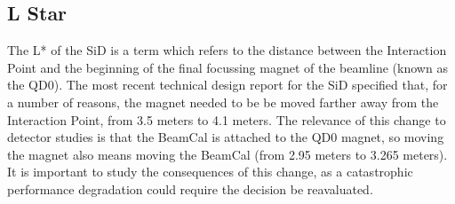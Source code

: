 \documentclass{report}
\begin{document}
            \subsection{L Star}

                The L* of the SiD is a term which refers to the distance between the Interaction Point and the beginning of the final focussing magnet of the beamline (known as the QD0). The most recent technical design report for the SiD specified that, for a number of reasons, the magnet needed to be be moved farther away from the Interaction Point, from 3.5 meters to 4.1 meters. The relevance of this change to detector studies is that the BeamCal is attached to the QD0 magnet, so moving the magnet also means moving the BeamCal (from 2.95 meters to 3.265 meters). It is important to study the consequences of this change, as a catastrophic performance degradation could require the decision be reavaluated.
                

\end{document}

